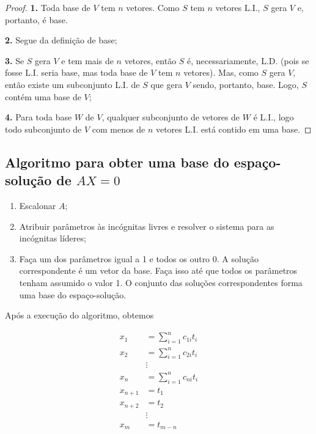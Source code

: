 \documentclass{article}
\begin{document}
\begin{proof}
	\textbf{1.} Toda base de $V$ tem $n$ vetores. Como $S$ tem $n$ vetores L.I., $S$ gera $V$ e, portanto, é base.
	
	\par\vspace{0.4cm}\hspace{16pt}\textbf{2.} Segue da definição de base;
	
	\par\vspace{0.4cm}\hspace{16pt}\textbf{3.} Se $S$ gera $V$ e tem mais de $n$ vetores, então $S$ é, necessariamente, L.D. (pois se fosse L.I. seria base, mas toda base de $V$ tem $n$ vetores). Mas, como $S$ gera $V$, então existe um subconjunto L.I. de $S$ que gera $V$ sendo, portanto, base. Logo, $S$ contém uma base de $V$;
	
	\par\vspace{0.4cm}\hspace{16pt}\textbf{4.} Para toda base $W$ de $V$, qualquer subconjunto de vetores de $W$ é L.I., logo todo subconjunto de $V$ com menos de $n$ vetores L.I. está contido em uma base.
\end{proof}

\subsection{Algoritmo para obter uma base do espaço-solução de $AX = 0$}
\begin{enumerate}
	\item Escalonar $A$;
	\item Atribuir parâmetros às incógnitas livres e resolver o sistema para as incógnitas líderes;
	\item Faça um dos parâmetros igual a 1 e todos os outro 0. A solução correspondente é um vetor da base. Faça isso até que todos os parâmetros tenham assumido o valor 1. O conjunto das soluções correspondentes forma uma base do espaço-solução. 
\end{enumerate}

\par\vspace{0.3cm} Após a execução do algoritmo, obtemos

\begin{align*}
x_1 &= \sum_{i=1}^{n}c_{1i}t_i \\
x_2 &= \sum_{i=1}^{n}c_{2i}t_i \\
&\vdots \\
x_n &= \sum_{i=1}^{n}c_{ni}t_i \\
x_{n+1}& = t_1 \\
x_{n+2}& = t_2 \\
&\vdots \\
x_{m}& = t_{m-n}
\end{align*}
\end{document}
